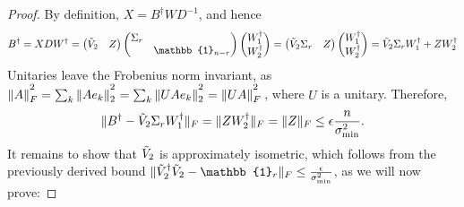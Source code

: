 \begin{proof}
By definition, $X=B^{\dag}WD^{-1}$, and hence
\begin{equation*}
B^{\dag}=XDW^{\dag} = 
\begin{pmatrix}
\Tilde{V}_2 & Z
\end{pmatrix}
\begin{pmatrix}
\Sigma_r &\\
& \mathbb{1}_{n-r}
\end{pmatrix}
\begin{pmatrix}
W_1^{\dag} \\ W_2^{\dag}
\end{pmatrix} = 
\begin{pmatrix}
\Tilde{V}_2 \Sigma_r & Z
\end{pmatrix}
\begin{pmatrix}
W_1^{\dag} \\ W_2^{\dag}
\end{pmatrix} = \Tilde{V}_2\Sigma_r W_1^{\dag} + ZW_2^{\dag}
\end{equation*}
Unitaries leave the Frobenius norm invariant, as $\|A\|_F^{\textstyle ^2}=\sum_k\|Ae_k\|_2^{\textstyle ^2} = \sum_k \|UAe_k\|_2^{\textstyle ^2}=\|UA\|_F^{\textstyle ^2}\thinspace$, where $U$ is a unitary. Therefore,
\begin{equation*}
\|B^{\dag}-\Tilde{V}_2\Sigma_r W_1^{\dag}\|_F=\|ZW_2^{\dag}\|_F=\|Z\|_F\leq\epsilon \frac{n}{\sigma_{\text{min}}^2}.
\end{equation*}
It remains to show that $\Tilde{V}_2$ is approximately isometric, which follows from the previously derived bound $\|\Tilde{V}_2^{\dag}\Tilde{V}_2 -\mathbb{1}_r\|_F\leq\frac{\epsilon}{\sigma_{\text{min}}^2}$, as we will now prove:


\end{proof}

